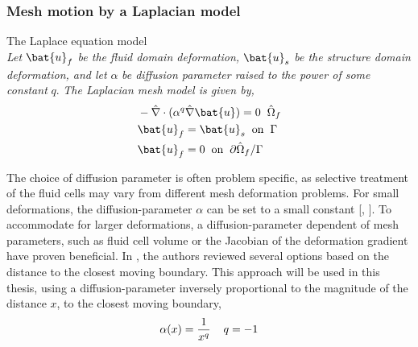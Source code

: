 \subsubsection*{Mesh motion by a Laplacian model}

\begin{equat}
The Laplace equation model \\ \textit{Let} $\bat{u}_f$ \textit{be the fluid domain deformation,} $\bat{u}_s$ \textit{be the structure domain deformation, and let} $\alpha$ \textit{be diffusion parameter raised to the power of some constant} $q$. \textit{The Laplacian  mesh model is given by, }   
\begin{align*}
&- \hat{\nabla} \cdot (\alpha^q \hat{\nabla} \bat{u}) = 0 \hspace{2mm} \hat{\Omega}_f\\
&\bat{u}_f = \bat{u}_s \hspace{2mm} \text{on} \hspace{2mm}  \Gamma \\
&\bat{u}_f = 0 \hspace{2mm} \text{on} \hspace{2mm} \partial \hat{\Omega}_f / \Gamma 
\end{align*}
\end{equat}

The choice of diffusion parameter  is often problem specific, as selective treatment of the fluid cells may vary from different mesh deformation problems. For small deformations, the diffusion-parameter $\alpha$ can be set to a small constant [\cite{Wick2013}, \cite{Richter2010c}]. To accommodate for larger deformations, a diffusion-parameter dependent of mesh parameters, such as fluid cell volume \cite{Crumpton1995} or the Jacobian of the deformation gradient \cite{Stein} have proven beneficial. In \cite{Jasak2006}, the authors reviewed several options based on the distance to the closest moving boundary. This approach will be used in this thesis, using a diffusion-parameter inversely proportional to the magnitude of the distance $x$, to the closest moving boundary,
\begin{align*}
\alpha(x) = \frac{1}{x^q}  \hspace{4mm} q = -1
\end{align*}


